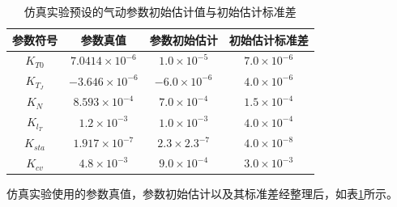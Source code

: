 \begin{table}[htbp]
    \centering
    \caption{仿真实验预设的气动参数初始估计值与初始估计标准差}
    \label{tab:true_theta}
    \begin{tabular}{cccc}
    \toprule
    参数符号 & 参数真值 & 参数初始估计 & 初始估计标准差 \\
    \midrule
    $K_{T0}$ & $7.0414 \times 10^{-6}$ & $1.0 \times 10^{-5}$ & $7.0 \times 10^{-6}$ \\
    $K_{T_J}$ & $-3.646 \times 10^{-6}$ & $-6.0 \times 10^{-6}$ & $4.0 \times 10^{-6}$ \\
    $K_{N}$ & $8.593 \times 10^{-4}$ & $7.0 \times 10^{-4}$ & $1.5 \times 10^{-4}$ \\
    $K_{l_T}$ & $1.2 \times 10^{-3}$ & $1.0 \times 10^{-3}$ & $4.0 \times 10^{-4}$ \\
    $K_{sta}$ & $1.917 \times 10^{-7}$ & $2.3 \times 2.3^{-7}$ & $4.0 \times 10^{-8}$ \\
    $K_{cv}$ & $4.8 \times 10^{-3}$ & $9.0 \times 10^{-4}$ & $3.0 \times 10^{-3}$ \\
    \bottomrule
    \end{tabular}
\end{table}

仿真实验使用的参数真值，参数初始估计以及其标准差经整理后，如表\ref{tab:true_theta}所示。

